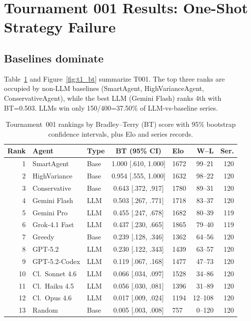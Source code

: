 \documentclass[11pt]{article}
\newcommand{\tOne}{T001}
\begin{document}
\section{Tournament 001 Results: One-Shot Strategy Failure}

\subsection{Baselines dominate}

Table~\ref{tab:t1_rank} and Figure~\ref{fig:t1_bt} summarize \tOne.
The top three ranks are occupied by non-LLM baselines (SmartAgent, HighVarianceAgent, ConservativeAgent), while the best LLM (Gemini Flash) ranks 4th with BT=0.503.
LLMs win only 150/400=37.50\% of LLM-vs-baseline series.

\begin{table}[t]
\centering
\small
\caption{Tournament~001 rankings by Bradley--Terry (BT) score with 95\% bootstrap confidence intervals, plus Elo and series records.}
\label{tab:t1_rank}
\begin{tabular}{rllclrr}
\toprule
Rank & Agent & Type & BT (95\% CI) & Elo & W--L & Ser. \\
\midrule
1 & SmartAgent & Base & 1.000 [.610, 1.000] & 1672 & 99--21 & 120 \\
2 & HighVariance & Base & 0.954 [.555, 1.000] & 1632 & 98--22 & 120 \\
3 & Conservative & Base & 0.643 [.372, .917] & 1780 & 89--31 & 120 \\
4 & Gemini Flash & LLM & 0.503 [.267, .771] & 1718 & 83--37 & 120 \\
5 & Gemini Pro & LLM & 0.455 [.247, .678] & 1682 & 80--39 & 119 \\
6 & Grok-4.1 Fast & LLM & 0.437 [.230, .665] & 1865 & 79--40 & 119 \\
7 & Greedy & Base & 0.239 [.128, .346] & 1362 & 64--56 & 120 \\
8 & GPT-5.2 & LLM & 0.230 [.122, .343] & 1439 & 63--57 & 120 \\
9 & GPT-5.2-Codex & LLM & 0.119 [.067, .168] & 1477 & 47--73 & 120 \\
10 & Cl.\ Sonnet 4.6 & LLM & 0.066 [.034, .097] & 1528 & 34--86 & 120 \\
11 & Cl.\ Haiku 4.5 & LLM & 0.056 [.030, .081] & 1396 & 31--89 & 120 \\
12 & Cl.\ Opus 4.6 & LLM & 0.017 [.009, .024] & 1194 & 12--108 & 120 \\
13 & Random & Base & 0.005 [.003, .008] & 757 & 0--120 & 120 \\
\bottomrule
\end{tabular}
\end{table}
\end{document}
